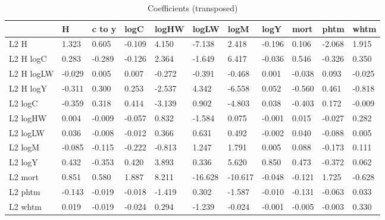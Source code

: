 \begin{table}[htbp]
\caption{\label{clabel} Coefficients (transposed)}\centering\medskip
\begin{tabular}{lllllllllll} \hline \hline
 & H  & c to y  & logC  & logHW  & logLW  & logM  & logY  & mort  & phtm  & whtm  \\  \hline 
L2 H &     1.323 &     0.605 &    -0.109 &     4.150 &    -7.138 &     2.418 &    -0.196 &     0.106 &    -2.068 &     1.915 \\  
L2 H logC &     0.283 &    -0.289 &    -0.126 &     2.364 &    -1.649 &     6.417 &    -0.036 &     0.546 &    -0.326 &     0.350 \\  
L2 H logLW &    -0.029 &     0.005 &     0.007 &    -0.272 &    -0.391 &    -0.468 &     0.001 &    -0.038 &     0.093 &    -0.025 \\  
L2 H logY &    -0.311 &     0.300 &     0.253 &    -2.537 &     4.342 &    -6.558 &     0.052 &    -0.560 &     0.461 &    -0.818 \\  
L2 logC &    -0.359 &     0.318 &     0.414 &    -3.139 &     0.902 &    -4.803 &     0.038 &    -0.403 &     0.172 &    -0.009 \\  
L2 logHW &     0.004 &    -0.009 &    -0.057 &     0.832 &    -1.584 &     0.075 &    -0.001 &     0.015 &    -0.027 &     0.282 \\  
L2 logLW &     0.036 &    -0.008 &    -0.012 &     0.366 &     0.631 &     0.492 &    -0.002 &     0.040 &    -0.088 &     0.005 \\  
L2 logM &    -0.085 &    -0.115 &    -0.222 &    -0.813 &     1.247 &     1.791 &     0.005 &     0.088 &    -0.173 &     0.111 \\  
L2 logY &     0.432 &    -0.353 &     0.420 &     3.893 &     0.336 &     5.620 &     0.850 &     0.473 &    -0.372 &     0.062 \\  
L2 mort &     0.851 &     0.580 &     1.887 &     8.211 &   -16.628 &   -10.617 &    -0.048 &    -0.121 &     1.725 &    -0.628 \\  
L2 phtm &    -0.143 &    -0.019 &    -0.018 &    -1.419 &     0.302 &    -1.587 &    -0.010 &    -0.131 &    -0.063 &     0.033 \\  
L2 whtm &     0.019 &    -0.019 &    -0.024 &     0.294 &    -1.239 &    -0.024 &    -0.001 &    -0.005 &    -0.003 &     0.330 \\  

\end{tabular}
\end{table}
